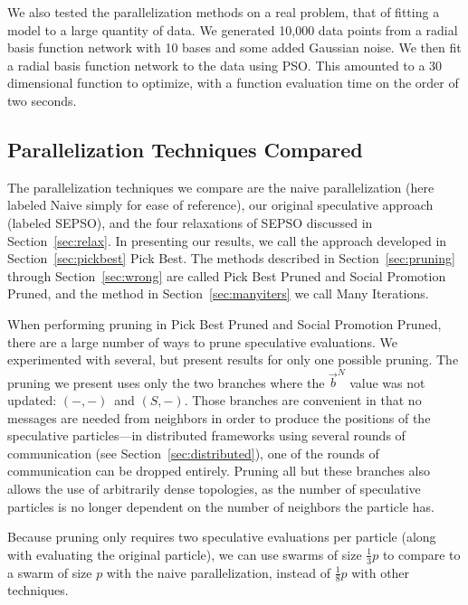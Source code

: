 \documentclass[smallcondensed]{svjour3}
\renewcommand{\sec}[1]{Section~\ref{sec:#1}}
\providecommand{\neigh}{\ensuremath{N}}
\providecommand{\nbest}{\ensuremath{\Vec{b}^\neigh}}
\providecommand{\casexn}{\ensuremath{(S,-)}}
\providecommand{\casepn}{\ensuremath{(-,-)}}
\begin{document}
We also tested the parallelization methods on a real problem, that of fitting a
model to a large quantity of data.  We generated 10,000 data points from a
radial basis function network with 10 bases and some added Gaussian noise.  We
then fit a radial basis function network to the data using PSO.  This amounted
to a 30 dimensional function to optimize, with a function evaluation time on
the order of two seconds.

\subsection{Parallelization Techniques Compared}

The parallelization techniques we compare are the naive parallelization (here
labeled Naive simply for ease of reference), our original speculative
approach (labeled SEPSO), and the four relaxations of SEPSO discussed in
\sec{relax}.  In presenting our results, we call the approach developed in
\sec{pickbest} Pick Best.  The methods described in \sec{pruning} through
\sec{wrong} are called Pick Best Pruned and Social Promotion Pruned, and the
method in \sec{manyiters} we call Many Iterations.

When performing pruning in Pick Best Pruned and Social Promotion Pruned, there
are a large number of ways to prune speculative evaluations.  We experimented
with several, but present results for only one possible pruning.  The pruning
we present uses only the two branches where the $\nbest$ value was not updated:
\casepn\ and \casexn.  Those branches are convenient in that no messages are
needed from neighbors in order to produce the positions of the speculative
particles---in distributed frameworks using several rounds of communication
(see \sec{distributed}), one of the rounds of communication can be dropped
entirely.  Pruning all but these branches also allows the use of arbitrarily
dense topologies, as the number of speculative particles is no longer dependent
on the number of neighbors the particle has.

Because pruning only requires two speculative evaluations per particle (along
with evaluating the original particle), we can use swarms of size
$\frac{1}{3}p$ to compare to a swarm of size $p$ with the naive
parallelization, instead of $\frac{1}{8}p$ with other techniques.
\end{document}
